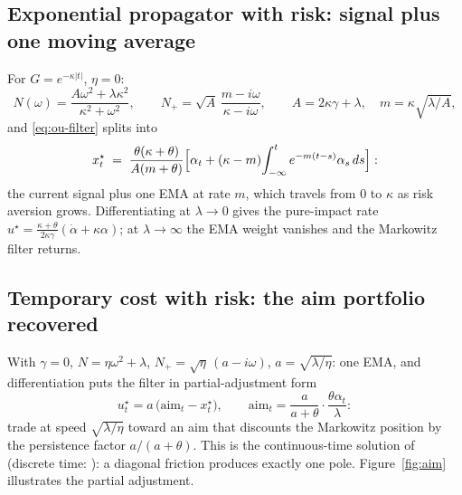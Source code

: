 \documentclass[11pt]{article}
\theoremstyle{plain}
\begin{document}
\subsection{Exponential propagator with risk: signal plus one moving average}

For $G = e^{-\kappa|t|}$, $\eta=0$:
\begin{equation}\label{eq:exp-factor}
N(\omega) = \frac{A\omega^2 + \lambda\kappa^2}{\kappa^2+\omega^2}, \qquad
N_+ = \sqrt A\,\frac{m-i\omega}{\kappa-i\omega}, \qquad
A = 2\kappa\gamma+\lambda,\quad m = \kappa\sqrt{\lambda/A},
\end{equation}
and \eqref{eq:ou-filter} splits into
\begin{equation}\label{eq:ema}
x^\star_t \;=\; \frac{\theta(\kappa+\theta)}{A(m+\theta)}\Bigl[\alpha_t + (\kappa-m)\!\int_{-\infty}^t e^{-m(t-s)}\alpha_s\,ds\Bigr]:
\end{equation}
the current signal plus one EMA at rate $m$, which travels from $0$ to $\kappa$ as risk aversion grows. Differentiating at $\lambda\to0$ gives the pure-impact rate $u^\star = \frac{\kappa+\theta}{2\kappa\gamma}(\dot\alpha+\kappa\alpha)$; at $\lambda\to\infty$ the EMA weight vanishes and the Markowitz filter returns.

\subsection{Temporary cost with risk: the aim portfolio recovered}

With $\gamma=0$, $N = \eta\omega^2+\lambda$, $N_+ = \sqrt\eta\,(a-i\omega)$, $a = \sqrt{\lambda/\eta}$: one EMA, and differentiation puts the filter in partial-adjustment form
\begin{equation}\label{eq:gp}
u^\star_t = a\,\bigl(\mathrm{aim}_t - x^\star_t\bigr), \qquad
\mathrm{aim}_t = \frac{a}{a+\theta}\cdot\frac{\theta\alpha_t}{\lambda}:
\end{equation}
trade at speed $\sqrt{\lambda/\eta}$ toward an aim that discounts the Markowitz position by the persistence factor $a/(a+\theta)$. This is the continuous-time solution of \citet{GarleanuPedersen2016} (discrete time: \citealp{GarleanuPedersen2013}): a diagonal friction produces exactly one pole. Figure~\ref{fig:aim} illustrates the partial adjustment.
\end{document}
